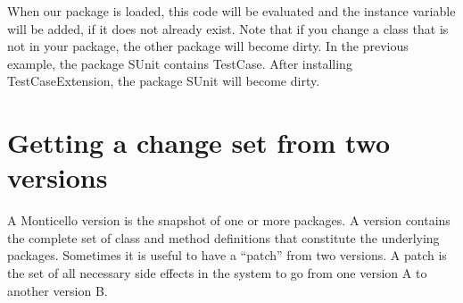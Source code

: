 \documentclass[a4paper,10pt,twoside]{book}
\begin{document}
When our package is loaded, this code will be evaluated and the instance variable will be added, if it does not already exist.
Note that if you change a class that is not in your package, the other package will become dirty. In the previous example, the package SUnit contains TestCase. After installing TestCaseExtension, the package SUnit will become dirty.








\section{Getting a change set from two versions}
A Monticello version is the snapshot of one or more packages. A version contains the complete set of class and method definitions that constitute the underlying packages. Sometimes it is useful to have a ``patch'' from two versions. A patch is the set of all necessary side effects in the system to go from one version A to another version B. 
\end{document}
